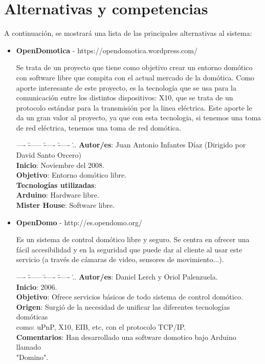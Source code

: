 \section{Alternativas y competencias}
    A continuación, se mostrará una lista de las principales alternativas al sistema:\\
    \begin{itemize}
    \item {\bf OpenDomotica} -  https://opendomotica.wordpress.com/ \par
	Se trata de un proyecto que tiene como objetivo crear un entorno domótico con software libre que compita con el actual mercado de la domótica. Como aporte interesante de este proyecto, es la tecnología que se usa para la comunicación entre los distintos dispositivos: X10, que se trata de un protocolo estándar para la transmisión por la linea eléctrica. Este aporte le da un gran valor al proyecto, ya que con esta tecnologia, si tenemos una toma de red eléctrica, tenemos una toma de red domótica.
            \begin{tabbing}
            ---- \= ------ \= ----- \= ----- \...\kill
            \>\> {\bf Autor/es}: Juan Antonio Infantes Díaz (Dirigido por David Santo Orcero)\\
            \>\> {\bf Inicio}: Noviembre del 2008.\\
            \>\> {\bf Objetivo}: Entorno domótico libre.\\
            \>\> {\bf Tecnologías utilizadas}:\\
            \>\>\> {\bf Arduino}: Hardware libre.\\
            \>\>\> {\bf Mister House}: Software libre.\\
            \end{tabbing}
               
     \item {\bf OpenDomo} - http://es.opendomo.org/ \par
Es un sistema de control domótico libre y seguro. Se centra en ofrecer una fácil accesibilidad y en la seguridad que puede dar al cliente al usar este servicio (a través de cámaras de video, sensores de movimiento...). 
     		\begin{tabbing}
     		---- \= ------ \= ----- \= ----- \...\kill
            \>\> {\bf Autor/es}: Daniel Lerch y Oriol Palenzuela.\\
            \>\> {\bf Inicio}: 2006.\\
            \>\> {\bf Objetivo}: Ofrece servicios básicos de todo sistema de control domótico.\\
            \>\> {\bf Origen}: Surgió de la necesidad de unificar las diferentes tecnologías domóticas\\\>\>\> como: uPnP, X10, EIB, etc, con el protocolo TCP/IP.\\
            \>\> {\bf Comentarios}: Han desarrollado una software domotico bajo Arduino llamado\\\>\>\> "Domino".\\
            \end{tabbing}
    \end{itemize}
    